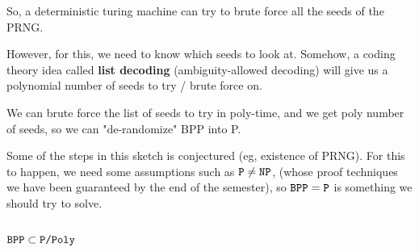 So, a deterministic turing machine can try to brute force all the seeds
of the PRNG.

However, for this, we need to know which seeds to look at. Somehow,
a coding theory idea called \textbf{list decoding} (ambiguity-allowed decoding)
will give us a polynomial number of seeds to try / brute force on.

We can brute force the list of seeds to try in poly-time, and we get poly
number of seeds, so we can "de-randomize" BPP into P.

Some of the steps in this sketch is conjectured (eg, existence of PRNG).  
For this to happen, we need some assumptions such as $\texttt{P} \neq \texttt{NP}$,
(whose proof techniques we have been guaranteed by the end of the semester),
so $\texttt{BPP} = \texttt{P}$ is something we should try to solve.

\subsection{$\texttt{BPP} \subset \texttt{P/Poly}$}

